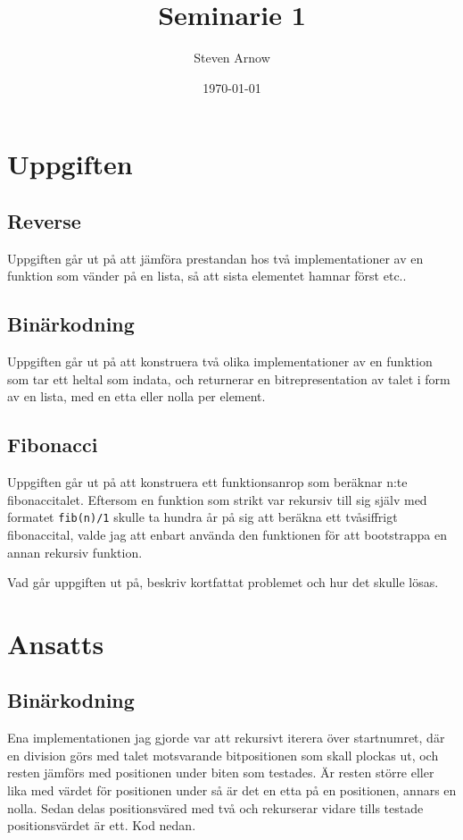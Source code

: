 \documentclass[a4paper, 11pt]{article}
\title{Seminarie 1}
\author{Steven Arnow}
\date{\today}
\begin{document}
\maketitle 

\section{Uppgiften}

\subsection{Reverse}

Uppgiften går ut på att jämföra prestandan hos två implementationer av en funktion som vänder på en lista, så att sista elementet hamnar först etc..


\subsection{Binärkodning}

Uppgiften går ut på att konstruera två olika implementationer av en funktion som tar ett heltal som indata, och returnerar en bitrepresentation av talet i form av en lista, med en etta eller nolla per element.


\subsection{Fibonacci}
Uppgiften går ut på att konstruera ett funktionsanrop som beräknar n:te fibonaccitalet. Eftersom en funktion som strikt var rekursiv till sig själv med formatet \texttt{fib(n)/1} skulle ta hundra år på sig att beräkna ett tvåsiffrigt fibonaccital, valde jag att enbart använda den funktionen för att bootstrappa en annan rekursiv funktion.

Vad går uppgiften ut på, beskriv kortfattat problemet och hur det skulle lösas.






\section{Ansatts}

\subsection{Binärkodning}

Ena implementationen jag gjorde var att rekursivt iterera över startnumret, där en division görs med talet motsvarande bitpositionen som skall plockas ut, och resten jämförs med positionen under biten som testades. Är resten större eller lika med värdet för positionen under så är det en etta på en positionen, annars en nolla. Sedan delas positionsväred med två och rekurserar vidare tills testade positionsvärdet är ett. Kod nedan.
\end{document}
